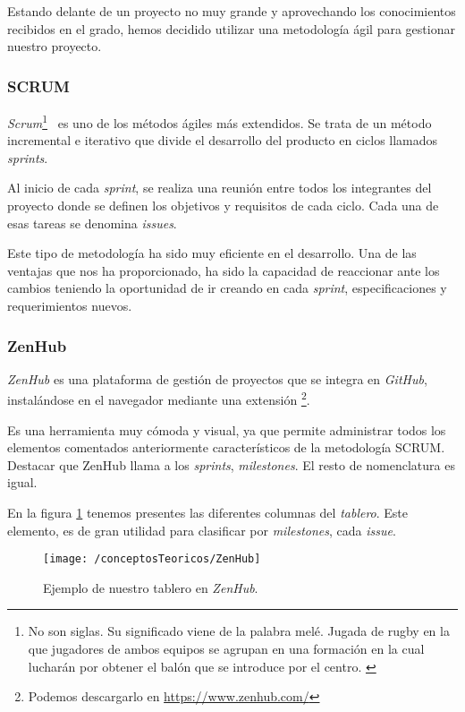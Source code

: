 Estando delante de un proyecto no muy grande y aprovechando los conocimientos recibidos en el grado, hemos decidido utilizar una metodología ágil para gestionar nuestro proyecto.

\subsubsection{SCRUM}

\textit{Scrum}\footnote{No son siglas. Su significado viene de la palabra melé. Jugada de rugby en la que jugadores de ambos equipos se agrupan en una formación en la cual lucharán por obtener el balón que se introduce por el centro. \cite{web:scrum_origen}}~\cite{web:scrum} es uno de los métodos ágiles más extendidos. Se trata de un método incremental e iterativo que divide el desarrollo del producto en ciclos llamados \textit{sprints}.

Al inicio de cada \textit{sprint}, se realiza una reunión entre todos los integrantes del proyecto donde se definen los objetivos y requisitos de cada ciclo. Cada una de esas tareas se denomina \textit{issues}.

Este tipo de metodología ha sido muy eficiente en el desarrollo. Una de las ventajas que nos ha proporcionado, ha sido la capacidad de reaccionar ante los cambios teniendo la oportunidad de ir creando en cada \textit{sprint}, especificaciones y requerimientos nuevos.

\subsubsection{ZenHub}

\textit{ZenHub} es una plataforma de gestión de proyectos que se integra en \textit{GitHub}, instalándose en el navegador mediante una extensión \footnote{Podemos descargarlo en \url{https://www.zenhub.com/}}.

Es una herramienta muy cómoda y visual, ya que permite administrar todos los elementos comentados anteriormente característicos de la metodología SCRUM. Destacar que ZenHub llama a los \textit{sprints}, \textit{milestones}. El resto de nomenclatura es igual.

En la figura \ref{fig:ZenHub} tenemos presentes las diferentes columnas del \textit{tablero}. Este elemento, es de gran utilidad para clasificar por \textit{milestones}, cada \textit{issue}.

\begin{figure}[ht]
	\centering
	\texttt{[image: /conceptosTeoricos/ZenHub]}
	\caption{Ejemplo de nuestro tablero en \textit{ZenHub}.}
	\label{fig:ZenHub}
\end{figure}

